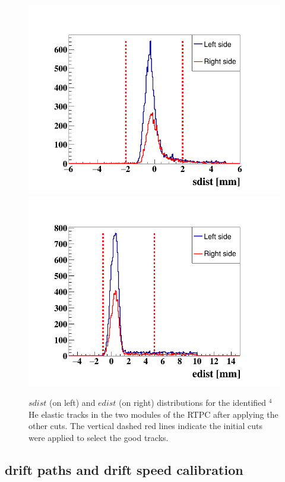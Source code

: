 \begin{figure}[tp]
\includegraphics[scale=0.34]{fig_rtpc/updates/sdist_elastic_1p2GeV.png}
\includegraphics[scale=0.34]{fig_rtpc/updates/edist_elastic_1p2GeV.png}
\caption{ $sdist$ (on left) and $edist$ (on right) distributions for the 
identified $^4$He elastic tracks in the two modules of the RTPC after applying 
the other cuts. The vertical dashed red lines indicate the initial cuts were 
applied to select the good tracks.}
\label{fig:2-sdist-edist}
\end{figure} 



\subsection{drift paths and drift speed calibration}

